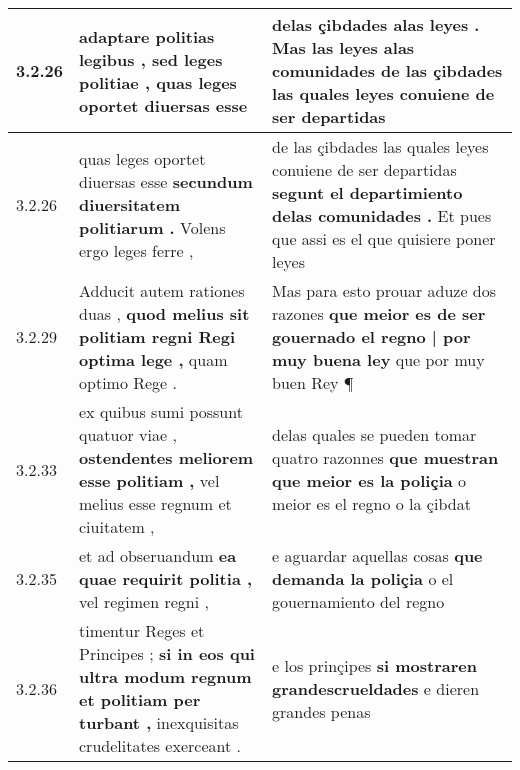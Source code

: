 \begin{tabular}{|p{1cm}|p{6.5cm}|p{6.5cm}|}
3.2.26 & adaptare politias legibus , \textbf{ sed leges politiae , } quas leges oportet diuersas esse & delas çibdades alas leyes . \textbf{ Mas las leyes alas comunidades } de las çibdades las quales leyes conuiene de ser departidas \\\hline
3.2.26 & quas leges oportet diuersas esse \textbf{ secundum diuersitatem politiarum . } Volens ergo leges ferre , & de las çibdades las quales leyes conuiene de ser departidas \textbf{ segunt el departimiento delas comunidades . } Et pues que assi es el que quisiere poner leyes \\\hline
3.2.29 & Adducit autem rationes duas , \textbf{ quod melius sit politiam regni Regi optima lege , } quam optimo Rege . & Mas para esto prouar aduze dos razones \textbf{ que meior es de ser gouernado el regno | por muy buena ley } que por muy buen Rey ¶ \\\hline
3.2.33 & ex quibus sumi possunt quatuor viae , \textbf{ ostendentes meliorem esse politiam , } vel melius esse regnum et ciuitatem , & delas quales se pueden tomar quatro razonnes \textbf{ que muestran que meior es la poliçia } o meior es el regno o la çibdat \\\hline
3.2.35 & et ad obseruandum \textbf{ ea quae requirit politia , } vel regimen regni , & e aguardar aquellas cosas \textbf{ que demanda la poliçia } o el gouernamiento del regno \\\hline
3.2.36 & timentur Reges et Principes ; \textbf{ si in eos qui ultra modum regnum et politiam per turbant , } inexquisitas crudelitates exerceant . & e los prinçipes \textbf{ si mostraren grandescrueldades } e dieren grandes penas \\\hline

\end{tabular}
